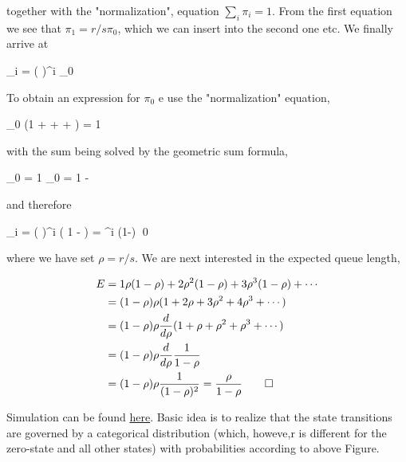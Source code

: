 together with the "normalization", equation $\sum_i \pi_i = 1$. From the first equation we see that $\pi_1 = r/s \pi_0$, which we can insert into the second one etc. We finally arrive at

\bee
\pi_i = \left(  \right)^i \pi_0
\eee

To obtain an expression for $\pi_0$ e use the "normalization" equation,

\bee
\pi_0 \left(1 +  +  + \cdots \right) = 1
\eee

with the sum being solved by the geometric sum formula,

\bee
\pi_0  = 1 \rightarrow \pi_0 = 1 - 
\eee

and therefore

\bee
\pi_i = \left(  \right)^i \left( 1 -  \right) = \rho^i (1-\rho) \qed
\eee

where we have set $\rho = r/s$. We are next interested in the expected queue length,

\begin{align*}
E &= 1 \rho(1-\rho) + 2 \rho^2(1-\rho)+  3 \rho^3(1-\rho) + \cdots \\
  &= (1-\rho) \rho (1+2\rho + 3 \rho^2 + 4 \rho^3 + \cdots) \\
  &= (1-\rho) \rho \frac{d}{d\rho} (1 + \rho + \rho^2 + \rho^3 + \cdots) \\
  &= (1-\rho) \rho \frac{d}{d\rho} \frac{1}{1 - \rho} \\
  &= (1-\rho) \rho \frac{1}{(1-\rho)^2} = \frac{\rho}{1 - \rho} \qed
\end{align*}

Simulation can be found \href{https://github.com/ClemensFMN/JuliaStuff/blob/master/SimJulia/discrete_time_queue.jl}{here}. Basic idea is to realize that the state transitions are governed by a categorical distribution (which, howeve,r is different for the zero-state and all other states) with probabilities according to above Figure.


